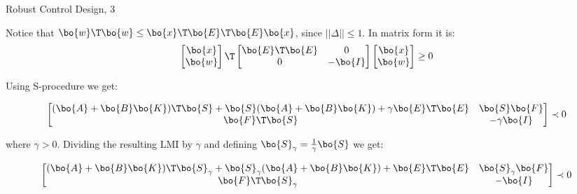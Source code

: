\documentclass{beamer}
\begin{document}
\begin{frame}{Robust Control Design, 3}
	\begin{flushleft}
		
		
		Notice that $\bo{w}\T\bo{w} \leq \bo{x}\T \bo{E}\T \bo{E} \bo{x}$, since $|| \Delta || \leq 1$. In matrix form it is:
		\begin{equation}
			\begin{bmatrix}
				\bo{x} \\ \bo{w}
			\end{bmatrix}\T
			\begin{bmatrix}
				\bo{E}\T \bo{E} & 0 \\
				0 & -\bo{I}
			\end{bmatrix}
			\begin{bmatrix}
				\bo{x} \\ \bo{w}
			\end{bmatrix} \geq 0
		\end{equation}
		
		Using S-procedure we get:
		
		\begin{equation}
			\begin{bmatrix}
				(\bo{A} + \bo{B}\bo{K})\T\bo{S} + \bo{S} (\bo{A} + \bo{B}\bo{K}) + \gamma \bo{E}\T \bo{E} & \bo{S}\bo{F} \\
				\bo{F}\T\bo{S} & -\gamma\bo{I}
			\end{bmatrix} \prec 0
		\end{equation}		
		
		where $\gamma > 0$. Dividing the resulting LMI by $\gamma$ and defining $\bo{S}_\gamma = \frac{1}{\gamma}\bo{S}$ we get:
		
		\begin{equation}
			\begin{bmatrix}
				(\bo{A} + \bo{B}\bo{K})\T\bo{S}_\gamma + \bo{S}_\gamma (\bo{A} + \bo{B}\bo{K}) + \bo{E}\T \bo{E} & \bo{S}_\gamma\bo{F} \\
				\bo{F}\T\bo{S}_\gamma & -\bo{I}
			\end{bmatrix} \prec 0
		\end{equation}
		
		
		
		
	\end{flushleft}
\end{frame}
\end{document}
